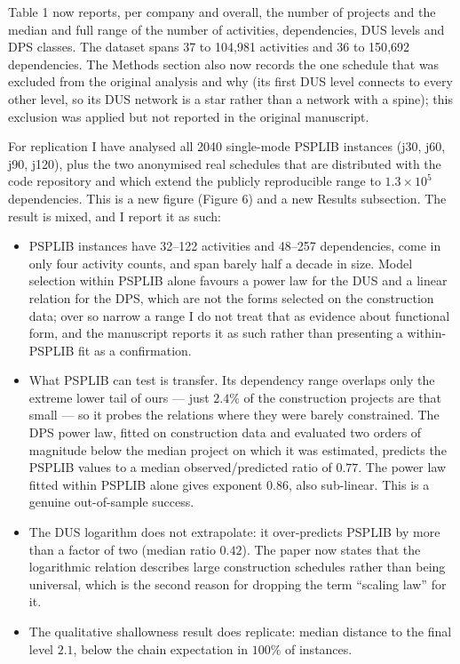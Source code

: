 \documentclass[11pt,a4paper]{article}
\begin{document}
Table 1 now reports, per company and overall, the number of projects and the
median and full range of the number of activities, dependencies, DUS levels and
DPS classes. The dataset spans 37 to 104{,}981 activities and 36 to 150{,}692
dependencies. The Methods section also now records the one schedule that was
excluded from the original analysis and why (its first DUS level connects to
every other level, so its DUS network is a star rather than a network with a
spine); this exclusion was applied but not reported in the original manuscript.

For replication I have analysed all 2040 single-mode PSPLIB instances (j30, j60,
j90, j120), plus the two anonymised real schedules that are distributed with the
code repository and which extend the publicly reproducible range to $1.3\times
10^{5}$ dependencies. This is a new figure (Figure 6) and a new Results
subsection. The result is mixed, and I report it as such:

\begin{itemize}
\item PSPLIB instances have 32--122 activities and 48--257 dependencies, come in
only four activity counts, and span barely half a decade in size. Model selection
within PSPLIB alone favours a power law for the DUS and a linear relation for the
DPS, which are not the forms selected on the construction data; over so narrow a
range I do not treat that as evidence about functional form, and the manuscript
reports it as such rather than presenting a within-PSPLIB fit as a confirmation.
\item What PSPLIB can test is transfer. Its dependency range overlaps only the
extreme lower tail of ours --- just $2.4\%$ of the construction projects are that
small --- so it probes the relations where they were barely constrained. The DPS
power law, fitted on construction data and evaluated two orders of magnitude
below the median project on which it was estimated, predicts the PSPLIB values to
a median observed/predicted ratio of $0.77$. The power law fitted within PSPLIB
alone gives exponent $0.86$, also sub-linear. This is a genuine out-of-sample
success.
\item The DUS logarithm does not extrapolate: it over-predicts PSPLIB by more
than a factor of two (median ratio $0.42$). The paper now states that the
logarithmic relation describes large construction schedules rather than being
universal, which is the second reason for dropping the term ``scaling law'' for
it.
\item The qualitative shallowness result does replicate: median distance to the
final level $2.1$, below the chain expectation in $100\%$ of instances.
\end{itemize}
\end{document}
